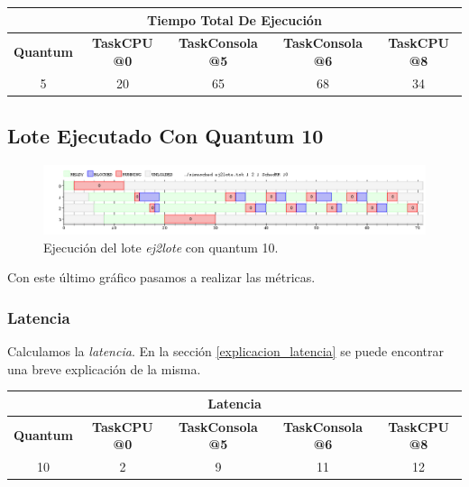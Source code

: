 \begin{center}
	\begin{tabular}{|c|c|c|c|c|}
		\hline
		\multicolumn{5}{|c|}{\large{\textbf{Tiempo Total De Ejecución}}} \\
		\hline
		\textbf{Quantum} & \textbf{TaskCPU @0} & \textbf{TaskConsola @5} & \textbf{TaskConsola @6} & \textbf{TaskCPU @8} \\
		\hline
		5 & 20 & 65 & 68 & 34 \\
		\hline
	\end{tabular}
\end{center}

\subsection{Lote Ejecutado Con Quantum 10}

\begin{figure}[!h]
	\begin{center}
		\includegraphics[width=500px]{imagenes/ej5_10.png}
		\caption{Ejecución del lote \emph{ej2lote} con quantum 10.}
		\label{fig:grafico_ej5_10}
	\end{center}
\end{figure}

Con este último gráfico pasamos a realizar las métricas.

\subsubsection{Latencia}

Calculamos la \emph{latencia}. En la sección \ref{explicacion_latencia} se puede encontrar una breve explicación de la misma.

\begin{center}
	\begin{tabular}{|c|c|c|c|c|}
		\hline
		\multicolumn{5}{|c|}{\large{\textbf{Latencia}}} \\
		\hline
		\textbf{Quantum} & \textbf{TaskCPU @0} & \textbf{TaskConsola @5} & \textbf{TaskConsola @6} & \textbf{TaskCPU @8} \\
		\hline
		10 & 2 & 9 & 11 & 12 \\
		\hline
	\end{tabular}
\end{center}

